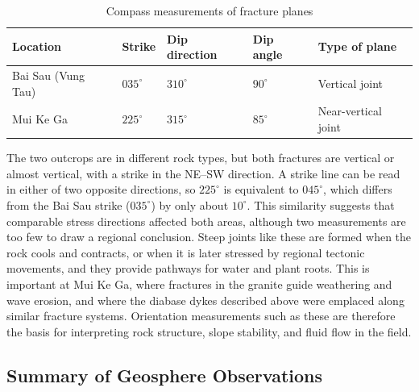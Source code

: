 \documentclass[11pt, a4paper]{article}
\begin{document}
\begin{table}[H]
    \centering
    \small
    \renewcommand{\arraystretch}{1.25}
    \caption{Compass measurements of fracture planes}
    \label{tab:compass_measurements}
    \begin{tabular}{p{3.2cm} p{2.4cm} p{2.9cm} p{2.4cm} p{3.1cm}}
        \toprule
        \textbf{Location} & \textbf{Strike} & \textbf{Dip direction} & \textbf{Dip angle} & \textbf{Type of plane} \\
        \midrule
        Bai Sau (Vung Tau) & $035^{\circ}$ & $310^{\circ}$ & $90^{\circ}$ & Vertical joint \\
        \midrule
        Mui Ke Ga & $225^{\circ}$ & $315^{\circ}$ & $85^{\circ}$ & Near-vertical joint \\
        \bottomrule
    \end{tabular}
\end{table}

The two outcrops are in different rock types, but both fractures are vertical or almost vertical, with a strike in the NE--SW direction. A strike line can be read in either of two opposite directions, so $225^{\circ}$ is equivalent to $045^{\circ}$, which differs from the Bai Sau strike ($035^{\circ}$) by only about $10^{\circ}$. This similarity suggests that comparable stress directions affected both areas, although two measurements are too few to draw a regional conclusion. Steep joints like these are formed when the rock cools and contracts, or when it is later stressed by regional tectonic movements, and they provide pathways for water and plant roots. This is important at Mui Ke Ga, where fractures in the granite guide weathering and wave erosion, and where the diabase dykes described above were emplaced along similar fracture systems. Orientation measurements such as these are therefore the basis for interpreting rock structure, slope stability, and fluid flow in the field.

\subsection{Summary of Geosphere Observations}
\label{subsec:geosphere_summary}
\end{document}
